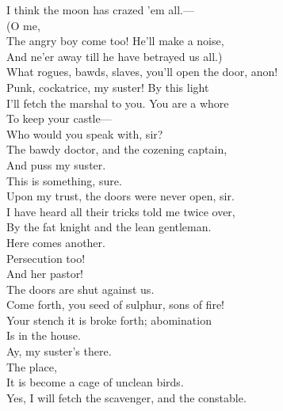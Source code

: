 \documentclass[a4paper,oneside,12pt]{memoir}
\begin{document}
\begin{drama*}
\facespeaks I think the moon has crazed 'em all.---\\
 (O me,\\
The angry boy come too! He'll make a noise,\\
And ne'er away till he have betrayed us all.)\\
\kastrilspeaks What rogues, bawds, slaves, you'll open the door, anon!\\
Punk, cockatrice, my suster! By this light\\
I'll fetch the marshal to you. You are a whore\\
To keep your castle---\\
\facespeaks {} Who would you speak with, sir?\\
\kastrilspeaks The bawdy doctor, and the cozening captain,\\
And puss my suster.\\
\lovewitspeaks {} This is something, sure.\\
\facespeaks Upon my trust, the doors were never open, sir.\\
\kastrilspeaks I have heard all their tricks told me twice over,\\
By the fat knight and the lean gentleman.\\
\lovewitspeaks Here comes another.\\
\facespeaks {} Persecution too!\\
And her pastor!\\
\tribulationspeaks {} The doors are shut against us.\\
\persecutionspeaks Come forth, you seed of sulphur, sons of fire!\\
Your stench it is broke forth; abomination\\
Is in the house.\\
\kastrilspeaks {} Ay, my suster's there.\\
\persecutionspeaks {} The place,\\
It is become a cage of unclean birds.\\
\kastrilspeaks Yes, I will fetch the scavenger, and the constable.\\

\end{drama*}
\end{document}
